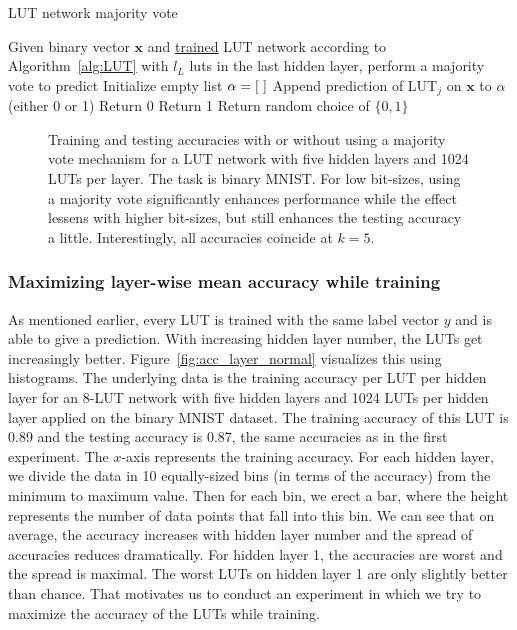 \begin{algorithm}
  \caption{LUT network majority vote}
  \label{alg:majority_vote}
  \begin{algorithmic}
    \State Given binary vector $\bm{x}$ and \underline{trained} LUT network according to Algorithm~\ref{alg:LUT} with $l_L$ luts in the last hidden layer, perform a majority vote to predict
    \vspace{1em}
    \State Initialize empty list $\alpha = [\hspace{0.3em}]$
      \State Append prediction of LUT$_j$ on $\bm{x}$ to $\alpha$ (either 0 or 1)
        \State Return 0
        \State Return 1
      \Else
        \State Return random choice of $\{0, 1\}$
      \EndIf
    \EndFor
  \end{algorithmic}
\end{algorithm}

\begin{figure}[!htb]
    \centering
    
    \caption{Training and testing accuracies with or without using a majority vote mechanism for a LUT network with five hidden layers and 1024 LUTs per layer. The task is binary MNIST. For low bit-sizes, using a majority vote significantly enhances performance while the effect lessens with higher bit-sizes, but still enhances the testing accuracy a little. Interestingly, all accuracies coincide at $k=5$.}
\label{fig:majority_vote}
\end{figure}
\FloatBarrier

\subsubsection{Maximizing layer-wise mean accuracy while training} \label{sec:max_layer_acc}
As mentioned earlier, every LUT is trained with the same label vector $y$ and is able to give a prediction. With increasing hidden layer number, the LUTs get increasingly better. Figure~\ref{fig:acc_layer_normal} visualizes this using histograms. The underlying data is the training accuracy per LUT per hidden layer for an 8-LUT network with five hidden layers and 1024 LUTs per hidden layer applied on the binary MNIST dataset. The training accuracy of this LUT is 0.89 and the testing accuracy is 0.87, the same accuracies as in the first experiment. The $x$-axis represents the training accuracy. For each hidden layer, we divide the data in 10 equally-sized bins (in terms of the accuracy) from the minimum to maximum value. Then for each bin, we erect a bar, where the height represents the number of data points that fall into this bin. We can see that on average, the accuracy increases with hidden layer number and the spread of accuracies reduces dramatically. For hidden layer 1, the accuracies are worst and the spread is maximal. The worst LUTs on hidden layer 1 are only slightly better than chance. That motivates us to conduct an experiment in which we try to maximize the accuracy of the LUTs while training.

